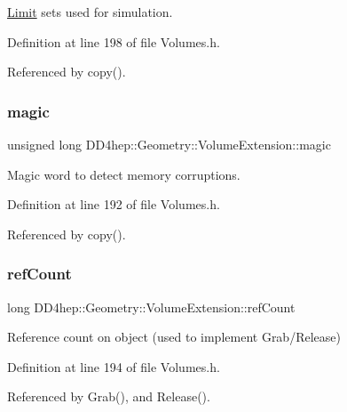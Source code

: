\hyperlink{class_d_d4hep_1_1_geometry_1_1_limit}{Limit} sets used for simulation. 



Definition at line 198 of file Volumes.\+h.



Referenced by copy().

\hypertarget{class_d_d4hep_1_1_geometry_1_1_volume_extension_ac2ad71bb6a554c749f06c8cce9a8fe8a}{}\label{class_d_d4hep_1_1_geometry_1_1_volume_extension_ac2ad71bb6a554c749f06c8cce9a8fe8a} 
\subsubsection{\texorpdfstring{magic}{magic}}
{\footnotesize\ttfamily unsigned long D\+D4hep\+::\+Geometry\+::\+Volume\+Extension\+::magic}



Magic word to detect memory corruptions. 



Definition at line 192 of file Volumes.\+h.



Referenced by copy().

\hypertarget{class_d_d4hep_1_1_geometry_1_1_volume_extension_a604559432eb0145b52013c5105a2566b}{}\label{class_d_d4hep_1_1_geometry_1_1_volume_extension_a604559432eb0145b52013c5105a2566b} 
\subsubsection{\texorpdfstring{ref\+Count}{refCount}}
{\footnotesize\ttfamily long D\+D4hep\+::\+Geometry\+::\+Volume\+Extension\+::ref\+Count}



Reference count on object (used to implement Grab/\+Release) 



Definition at line 194 of file Volumes.\+h.



Referenced by Grab(), and Release().

